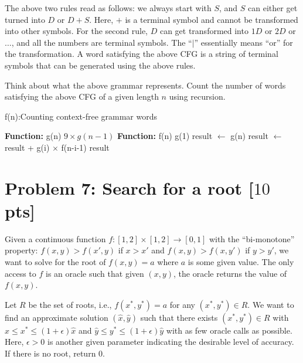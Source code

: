 \documentclass[letterpaper, 11pt]{article}
\newcommand{\1}{\mathds{1}}	%
\theoremstyle{definition}
\newcommand{\problem}[1]{\section*{Problem #1}}
\newenvironment{solution}{{\par\noindent\it Solution.}}{}
\begin{document}
The above two rules read as follows: we always start with $S$, and $S$ can either get turned into $D$ or $D+S$. Here, $+$ is a terminal symbol and cannot be transformed into other symbols. For the second rule, $D$ can get transformed into $1D$ or $2D$ or $\ldots$, and all the numbers are terminal symbols. The ``$|$'' essentially means ``or'' for the transformation. A word satisfying the above CFG is a string of terminal symbols that can be generated using the above rules.

Think about what the above grammar represents. Count the number of words satisfying the above CFG of a given length $n$ using recursion.


\begin{solution}
        \begin{algorithm}[H]
        \caption{f(n):Counting context-free grammar words }
        \begin{algorithmic}[1]
            \STATE \textbf{Function:} g(n)
            \ELSE
                \RETURN \(9 \times g(n-1)\) 
            \ENDIF
        \STATE \textbf{Function:} f(n)
                \RETURN g(1) 
            \ENDIF
            \STATE result \(\gets\) g(n) 
                \STATE result \(\gets\) result + g(i) \(\times\) f(n-i-1) 
            \ENDFOR
            \RETURN result
        \end{algorithmic}
        \end{algorithm}
\end{solution}

\problem{7: Search for a root [$10$ pts]}
Given a continuous function $f : [1,2]\times[1,2] \rightarrow [0,1]$ with the ``bi-monotone'' property: $f(x,y) > f(x',y)$ if $x > x'$ and $f(x,y) > f(x,y')$ if $y > y'$, we want to solve for the root of $f(x,y) = a$ where $a$ is some given value. The only access to $f$ is an oracle such that given $(x,y)$, the oracle returns the value of $f(x,y)$.

Let $R$ be the set of roots, i.e., $f(x^*,y^*) = a$ for any $(x^*,y^*) \in R$. We want to find an approximate solution $(\hat{x},\hat{y})$ such that there exists $(x^*,y^*) \in R$ with $\hat{x} \leq x^* \leq (1+\epsilon) \hat{x}$ and $\hat{y} \leq y^* \leq (1+\epsilon) \hat{y}$ with as few oracle calls as possible. Here, $\epsilon > 0$ is another given parameter indicating the desirable level of accuracy. If there is no root, return $0$.
\end{document}
